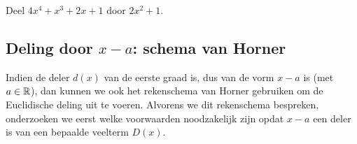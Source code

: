 \documentclass{ximera}
\begin{document}
\begin{example}
 Deel $4x^4+x^3+2x+1$ door $2x^2+1$.
\begin{feedback}
\end{feedback}
\end{example}



\subsection{\texorpdfstring{Deling door $x-a$: schema van Horner} {Deling door x-a: schema van Horner}}

Indien de deler $d(x)$ van de eerste graad is, dus van de vorm $x-a$ is (met $a\in\mathbb{R}$), dan kunnen we ook het rekenschema van Horner gebruiken om de Euclidische deling uit te voeren. 
Alvorens we dit rekenschema bespreken, onderzoeken we eerst welke voorwaarden noodzakelijk
zijn opdat $x-a$ een deler is van een bepaalde veelterm $D(x)$.
\end{document}
